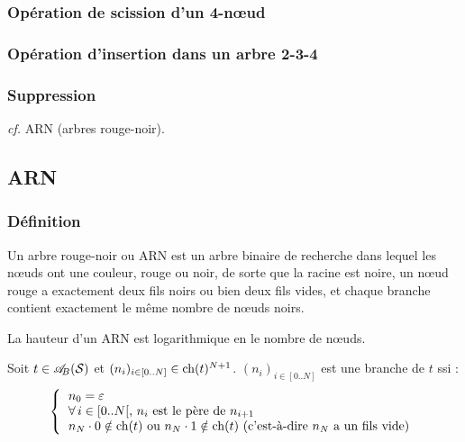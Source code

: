 		\subsubsection{Opération de scission d'un 4-n\oe ud}
		
		\subsubsection{Opération d'insertion dans un arbre 2-3-4}
		
		\subsubsection{Suppression}
		
			\emph{cf.} ARN (arbres rouge-noir).
		
	\subsection{ARN}
	
		\subsubsection{Définition}
		
			\begin{Definition}
				Un arbre rouge-noir ou ARN est un arbre binaire de recherche dans lequel les n\oe uds ont une couleur, rouge ou noir, de sorte que la racine est noire, un n\oe ud rouge a exactement deux fils noirs ou bien deux fils vides, et chaque branche contient exactement le même nombre de n\oe uds noirs.
			\end{Definition}
		
			\begin{Proposition}
			\end{Proposition}
			
			\begin{Remarque}
				La hauteur d'un ARN est logarithmique en le nombre de n\oe uds.
			\end{Remarque}
			
			\colsep{1.5pt}
			\begin{Definition}[branche (???)]
				Soit \(t\in\mathscr{A}_{\!B}(\mathcal{S})\) et \((n_i)_{i\in[0..N]}\in\operatorname{ch}(t)^{N+1}\). \((n_i)_{i\in[0..N]}\) est une branche de \(t\) ssi :
					\[
						\left\{ \begin{tabular}[h]{l}
							\(n_0=\varepsilon\) \\
							\(\forall\,i\in[0..N[\), \(n_i\) est le père de \(n_{i+1}\) \\
							\(n_N\cdot0\notin\ch(t)\) ou \(n_N\cdot1\notin\ch(t)\) (c'est-à-dire \(n_N\) a un fils vide)
						\end{tabular} \right.
					\]
			\end{Definition}
		
